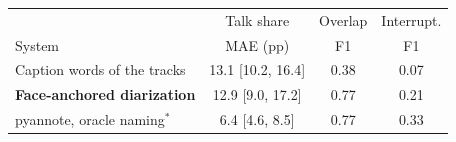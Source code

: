 \begin{tabular}{@{}lccc@{}}
\toprule
& Talk share & Overlap & Interrupt. \\
System & MAE (pp) & F1 & F1 \\
\midrule
Caption words of the tracks & 13.1 {\scriptsize[10.2, 16.4]} & 0.38 & 0.07 \\
\textbf{Face-anchored diarization} & 12.9 {\scriptsize[9.0, 17.2]} & 0.77 & 0.21 \\
pyannote, oracle naming$^\ast$ & 6.4 {\scriptsize[4.6, 8.5]} & 0.77 & 0.33 \\
\bottomrule
\end{tabular}

